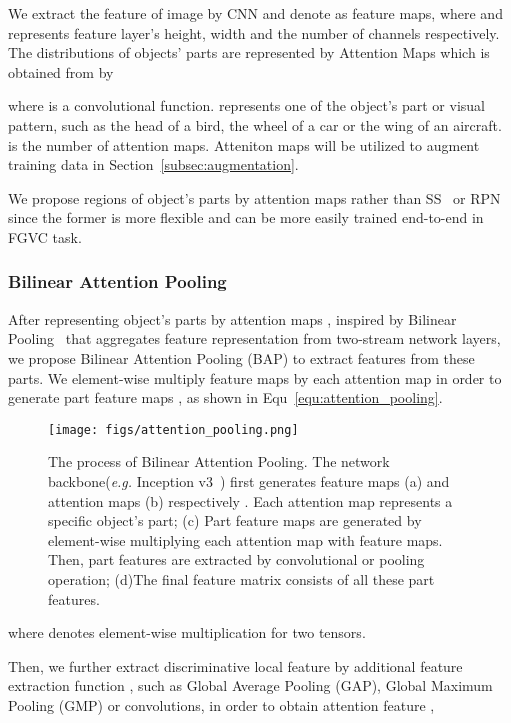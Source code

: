 \documentclass[10pt,twocolumn,letterpaper]{article}
\def\eg{{\em e.g. }}
\begin{document}
We extract the feature of image  by CNN and denote  as feature maps, where  and  represents feature layer's height, width and the number of channels respectively. The distributions of objects' parts are represented by Attention Maps  which is obtained from  by

 where  is a convolutional function.  represents one of the object's part or visual pattern, such as the head of a bird, the wheel of a car or the wing of an aircraft.  is the number of attention maps. Atteniton maps will be utilized to augment training data in Section~\ref{subsec:augmentation}.

 We propose regions of object's parts by attention maps rather than SS~\cite{ss} or RPN~\cite{faster-rcnn} since the former is more flexible and can be more easily trained end-to-end in FGVC task.

\subsubsection{Bilinear Attention Pooling}
After representing object's parts by attention maps , inspired by Bilinear Pooling~\cite{bcnn} that aggregates feature representation from two-stream network layers, we propose Bilinear Attention Pooling (BAP) to extract features from these parts. We element-wise multiply feature maps  by each attention map  in order to generate  part feature maps , as shown in Equ~\ref{equ:attention_pooling}.

\begin{figure}[h]
    \begin{center}
        \texttt{[image: figs/attention\_pooling.png]}
    \end{center}
    \caption{\small The process of Bilinear Attention Pooling. The network backbone(\eg Inception v3~\cite{inception}) first generates feature maps (a) and attention maps (b) respectively . Each attention map represents a specific object's part; (c) Part feature maps are generated by element-wise multiplying each attention map with feature maps. Then, part features are extracted by convolutional or pooling operation; (d)The final feature matrix consists of all these part features.}
    \label{fig:attention_pooling}
\end{figure}


where  denotes element-wise multiplication for two tensors.

Then, we further extract discriminative local feature by additional feature extraction function , such as Global Average Pooling (GAP), Global Maximum Pooling (GMP) or convolutions, in order to obtain  attention feature ,
\end{document}
